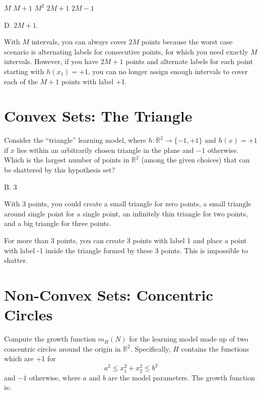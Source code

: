 \documentclass[answers]{exam}
\begin{document}
\begin{questions}
\begin{choices}
    \choice $M$
    \choice $M + 1$
    \choice $M^2$
    \choice $2M + 1$
    \choice $2M - 1$
\end{choices}

\begin{solution}
D. $2M + 1$.

With $M$ intervals, you can always cover $2M$ points because the worst case
scenario is alternating labels for consecutive points, for which you need
exactly $M$ intervals. However, if you have $2M + 1$ points and alternate 
labels for each point starting with $h(x_1) = +1$, you can no longer assign
enough intervals to cover each of the $M+1$ points with label +1.

\end{solution}

\section*{Convex Sets: The Triangle}

\question
Consider the “triangle” learning model, where $h : \mathbb{R}^2 \to 
\{-1,+1\}$ and $h(x) = +1$ if $x$ lies within an arbitrarily chosen 
triangle in the plane and $-1$ otherwise. Which is the largest number 
of points in $\mathbb{R}^2$ (among the given choices) that can be 
shattered by this hypothesis set?

\begin{choices}
\end{choices}

\begin{solution}
B. 3

With 3 points, you could create a small triangle for zero points,
a small triangle around single point for a single point, an infinitely thin 
triangle for two points, and a big triangle for three points.

For more than 3 points, you can create 3 points with label 1 and place a point 
with label -1 inside the triangle formed by these 3 points. This is impossible 
to shatter.
\end{solution}

\section*{Non-Convex Sets: Concentric Circles}

\question
Compute the growth function $m_H(N)$ for the learning model made up of 
two concentric circles around the origin in $\mathbb{R}^2$. 
Specifically, $H$ contains the functions which are +1 for
\[
a^2 \leq x_1^2 + x_2^2 \leq b^2
\]
and $-1$ otherwise, where $a$ and $b$ are the model parameters. The 
growth function is:


\end{questions}
\end{document}
